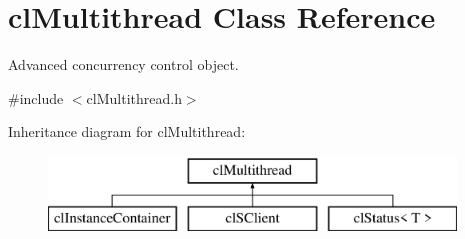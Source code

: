 \hypertarget{classcl_multithread}{
\section{clMultithread Class Reference}
\label{classcl_multithread}
}


Advanced concurrency control object.  




{\ttfamily \#include $<$clMultithread.h$>$}

Inheritance diagram for clMultithread:\begin{figure}[H]
\begin{center}
\leavevmode
\includegraphics[height=2.000000cm]{classcl_multithread}
\end{center}
\end{figure}
